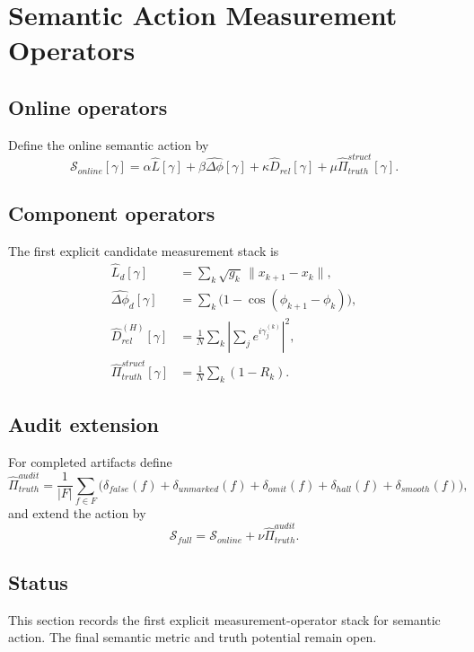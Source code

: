 \section{Semantic Action Measurement Operators}
\label{sec:semantic-action-measurement}

\subsection{Online operators}
Define the online semantic action by
\begin{equation}
\mathcal S_{online}[\gamma] = \alpha\widehat L[\gamma] + \beta\widehat{\Delta\phi}[\gamma] + \kappa\widehat D_{rel}[\gamma] + \mu\widehat\Pi_{truth}^{struct}[\gamma].
\end{equation}

\subsection{Component operators}
The first explicit candidate measurement stack is
\begin{align}
\widehat L_d[\gamma] &= \sum_k \sqrt{g_k}\,\|x_{k+1}-x_k\|,\\
\widehat{\Delta\phi}_d[\gamma] &= \sum_k \bigl(1-\cos(\phi_{k+1}-\phi_k)\bigr),\\
\widehat D_{rel}^{(H)}[\gamma] &= \frac1N\sum_k \left|\sum_j e^{i\gamma_j^{(k)}}\right|^2,\\
\widehat\Pi_{truth}^{struct}[\gamma] &= \frac1N\sum_k (1-R_k).
\end{align}

\subsection{Audit extension}
For completed artifacts define
\begin{equation}
\widehat\Pi_{truth}^{audit} = \frac1{|F|}\sum_{f\in F}\bigl(\delta_{false}(f)+\delta_{unmarked}(f)+\delta_{omit}(f)+\delta_{hall}(f)+\delta_{smooth}(f)\bigr),
\end{equation}
and extend the action by
\begin{equation}
\mathcal S_{full} = \mathcal S_{online} + \nu\widehat\Pi_{truth}^{audit}.
\end{equation}

\subsection{Status}
This section records the first explicit measurement-operator stack for semantic action. The final semantic metric and truth potential remain open.
